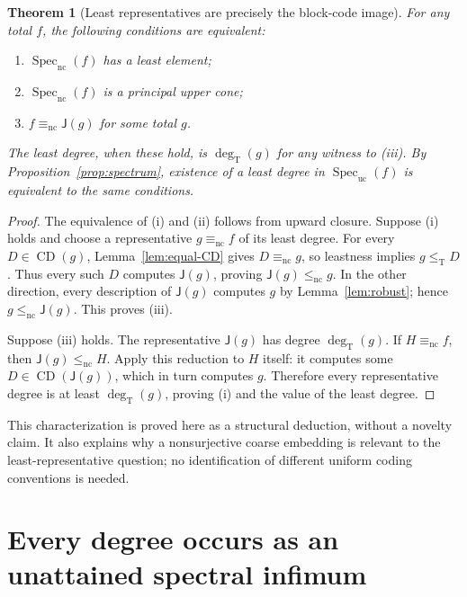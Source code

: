 \documentclass[11pt,a4paper]{article}
\newcommand{\leT}{\leq_{\mathrm T}}
\newcommand{\degT}{\operatorname{deg}_{\mathrm T}}
\newcommand{\CD}{\operatorname{CD}}
\newcommand{\Spec}{\operatorname{Spec}}
\newcommand{\nc}{\mathrm{nc}}
\newcommand{\uc}{\mathrm{uc}}
\newcommand{\J}{\mathsf J}
\newtheorem{theorem}{Theorem}[section]
\theoremstyle{definition}\newtheorem{definition}[theorem]{Definition}
\theoremstyle{remark}\newtheorem{remark}[theorem]{Remark}
\begin{document}
\begin{theorem}[Least representatives are precisely the block-code image]
\label{thm:least-characterization}
For any total $f$, the following conditions are equivalent:
\begin{enumerate}[label=\textup{(\roman*)}]
\item $\Spec_\nc(f)$ has a least element;
\item $\Spec_\nc(f)$ is a principal upper cone;
\item $f\equiv_\nc\J(g)$ for some total $g$.
\end{enumerate}
The least degree, when these hold, is $\degT(g)$ for any witness to \textup{(iii)}. By Proposition~\ref{prop:spectrum}, existence of a least degree in $\Spec_\uc(f)$ is equivalent to the same conditions.
\end{theorem}
\begin{proof}
The equivalence of (i) and (ii) follows from upward closure. Suppose (i) holds and choose a representative $g\equiv_\nc f$ of its least degree. For every $D\in\CD(g)$, Lemma~\ref{lem:equal-CD} gives $D\equiv_\nc g$, so leastness implies $g\leT D$. Thus every such $D$ computes $\J(g)$, proving $\J(g)\le_\nc g$. In the other direction, every description of $\J(g)$ computes $g$ by Lemma~\ref{lem:robust}; hence $g\le_\nc\J(g)$. This proves (iii).

Suppose (iii) holds. The representative $\J(g)$ has degree $\degT(g)$. If $H\equiv_\nc f$, then $\J(g)\le_\nc H$. Apply this reduction to $H$ itself: it computes some $D\in\CD(\J(g))$, which in turn computes $g$. Therefore every representative degree is at least $\degT(g)$, proving (i) and the value of the least degree.
\end{proof}

This characterization is proved here as a structural deduction, without a novelty claim. It also explains why a nonsurjective coarse embedding is relevant to the least-representative question; no identification of different uniform coding conventions is needed.

\section{Every degree occurs as an unattained spectral infimum}
\label{sec:infimum}
\end{document}
